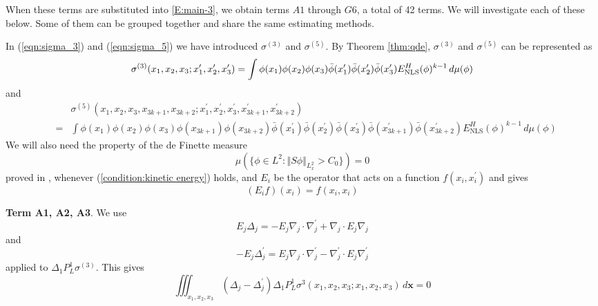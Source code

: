 \documentclass[12pt,letterpaper,leqno]{amsart}
\theoremstyle{plain}
\numberwithin{equation}{section}
\numberwithin{theorem}{section}
\numberwithin{proposition}{section}
\numberwithin{lemma}{section}
\numberwithin{corollary}{section}
\begin{document}
When these terms are substituted into \eqref{E:main-3}, we obtain terms $A1$
through $G6$, a total of 42 terms. We will investigate each of these below.
Some of them can be grouped together and share the same estimating methods.

In (\ref{eqn:sigma_3}) and (\ref{eqn:sigma_5}) we have introduced $\sigma
^{(3)}$ and $\sigma ^{(5)}$. By Theorem \ref{thm:qde}, $\sigma ^{(3)}$ and $%
\sigma ^{(5)}$ can be represented as 
\begin{equation*}
\sigma ^{(3)}(x_{1},x_{2},x_{3};x_{1}^{\prime },x_{2}^{\prime
},x_{3}^{\prime })=\int \phi (x_{1})\phi (x_{2})\phi (x_{3})\bar{\phi}%
(x_{1}^{\prime })\bar{\phi}(x_{2}^{\prime })\bar{\phi}(x_{3}^{\prime })E_{%
\text{NLS}}^{H}(\phi )^{k-1}\,d\mu (\phi )
\end{equation*}%
and 
\begin{eqnarray*}
&&\sigma ^{(5)}(x_{1},x_{2},x_{3},x_{3k+1},x_{3k+2};x_{1}^{\prime
},x_{2}^{\prime },x_{3}^{\prime },x_{3k+1}^{\prime },x_{3k+2}^{\prime }) \\
&=&\int \phi (x_{1})\phi (x_{2})\phi (x_{3})\phi (x_{3k+1})\phi (x_{3k+2})%
\bar{\phi}(x_{1}^{\prime })\bar{\phi}(x_{2}^{\prime })\bar{\phi}%
(x_{3}^{\prime })\bar{\phi}(x_{3k+1}^{\prime })\bar{\phi}(x_{3k+2}^{\prime
})E_{\text{NLS}}^{H}(\phi )^{k-1}\,d\mu (\phi )
\end{eqnarray*}%
We will also need the property of the de Finette measure 
\begin{equation}
\mu \left( \{\phi \in L^{2}:\left\Vert S\phi \right\Vert
_{L_{x}^{2}}>C_{0}\}\right) =0  \label{eqn:property of measure 1}
\end{equation}%
proved in \cite[Lemma 4.5]{TCNPdeFinitte}, whenever (\ref{condition:kinetic
energy}) holds, and $E_{i}$ be the operator that acts on a function $%
f(x_{i},x_{i}^{\prime })$ and gives 
\begin{equation*}
(E_{i}f)(x_{i})=f(x_{i},x_{i})
\end{equation*}

\noindent \textbf{Term A1, A2, A3}. We use 
\begin{equation*}
E_{j}\Delta _{j}=-E_{j}\nabla _{j}\cdot \nabla _{j}^{\prime }+\nabla
_{j}\cdot E_{j}\nabla _{j}
\end{equation*}%
and 
\begin{equation*}
-E_{j}\Delta _{j}^{\prime }=E_{j}\nabla _{j}\cdot \nabla _{j}^{\prime
}-\nabla _{j}^{\prime }\cdot E_{j}\nabla _{j}^{\prime }
\end{equation*}%
applied to $\Delta _{1}P_{L}^{1}\sigma ^{(3)}$. This gives 
\begin{equation*}
\iiint_{x_{1},x_{2},x_{3}}(\Delta _{j}-\Delta _{j}^{\prime })\Delta
_{1}P_{L}^{1}\sigma ^{3}(x_{1},x_{2},x_{3};x_{1},x_{2},x_{3})\,d\mathbf{x}=0
\end{equation*}
\end{document}
